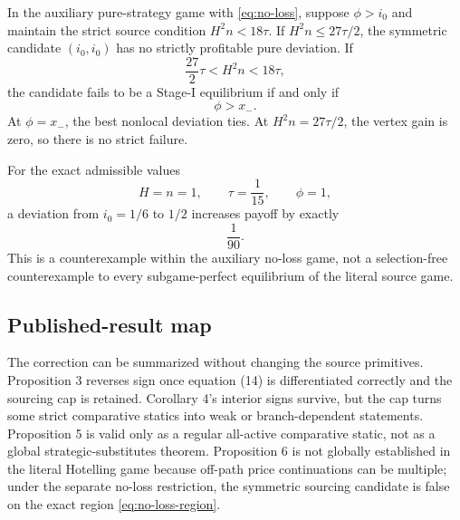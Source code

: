 \begin{proposition}
\label{prop:no-loss}
In the auxiliary pure-strategy game with \eqref{eq:no-loss}, suppose \(\phi>i_0\) and maintain the strict source condition \(H^2n<18\tau\).  If \(H^2n\le27\tau/2\), the symmetric candidate \((i_0,i_0)\) has no strictly profitable pure deviation.  If
\[
\frac{27}{2}\tau<H^2n<18\tau,
\]
the candidate fails to be a Stage-I equilibrium if and only if
\begin{equation}
\phi>x_-.
\label{eq:no-loss-region}
\end{equation}
At \(\phi=x_-\), the best nonlocal deviation ties.  At \(H^2n=27\tau/2\), the vertex gain is zero, so there is no strict failure.
\end{proposition}

For the exact admissible values
\[
H=n=1,\qquad \tau=\frac1{15},\qquad \phi=1,
\]
a deviation from \(i_0=1/6\) to \(1/2\) increases payoff by exactly
\begin{equation}
\frac1{90}.
\label{eq:one-ninety}
\end{equation}
This is a counterexample within the auxiliary no-loss game, not a selection-free counterexample to every subgame-perfect equilibrium of the literal source game.

\subsection{Published-result map}

The correction can be summarized without changing the source primitives.  Proposition 3 reverses sign once equation (14) is differentiated correctly and the sourcing cap is retained.  Corollary 4's interior signs survive, but the cap turns some strict comparative statics into weak or branch-dependent statements.  Proposition 5 is valid only as a regular all-active comparative static, not as a global strategic-substitutes theorem.  Proposition 6 is not globally established in the literal Hotelling game because off-path price continuations can be multiple; under the separate no-loss restriction, the symmetric sourcing candidate is false on the exact region \eqref{eq:no-loss-region}.
